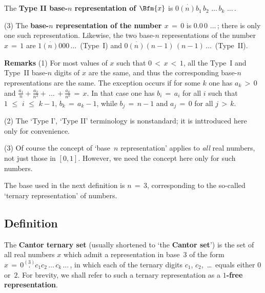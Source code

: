 {        The {\bf Type II base-$n$ representation of $\Bfm{x}$} is $0 \stackrel{.}{(n)}b_{1}\,b_{2}\,\,{\ldots}\,b_{k}\,\,{\ldots}\,$.

\VA

        (3) The {\bf base-$n$ representation of the number $x \,=\, 0$} is $0.0\,0\,\,{\ldots}\,$; there is only one such representation.
    Likewise, the two base-$n$ representations of the number $x \,=\, 1$ are $1\stackrel{.}{(n)}000\,{\ldots}\,$ (Type~I)
    and $0\stackrel{.}{(n)}(n-1)\,(n-1)\,{\ldots}\,$ (Type~II).

\VA



        {\bf Remarks} (1) For most values of $x$ such that $0\,<\,x\,<\,1$, all the Type~I and Type~II base-$n$ digits of $x$ are the same,
    and thus the corresponding base-$n$ representations are the same. The exception occurs if for some $k$ one has
    $a_{k}\,>\,0$ and ${\displaystyle \frac{a_{1}}{n} + \frac{a_{2}}{n^{2}} + \,{\ldots}\, + \frac{a_{k}}{n^{k}} \,=\, x}$.
    In that case one has $b_{i} \,=\, a_{i}$ for all $i$ such that $1\,\,{\leq}\,\,i\,\,{\leq}\,\,k-1$, $b_{k} \,=\, a_{k} - 1$,
    while $b_{j} \,=\, n-1$ and $a_{j} \,=\, 0$ for all $j\,>\,k$.

        (2) The `Type I', `Type II' terminology is nonstandard; it is inttroduced here only for convenience.

        (3) Of course the concept of `base~$n$ representation' applies to {\em all} real numbers, not just those in $[0,1]$.
    However, we need the concept here only for such numbers.

\VV

        The base used in the next definition is $n \,=\, 3$, corresponding to the so-called `ternary representation' of numbers.

\V

            \subsection{\small{\bf Definition}}
            \label{DefA20.100}

        The {\bf Cantor ternary set} (usually shortened to `the {\bf Cantor set}') is the set of all real numbers $x$
    which admit a representation in base~$3$ of the form $x \,=\, 0\stackrel{(3)}{.}c_{1}c_{2}\,{\ldots}\,c_{k}\,{\ldots}\,$,
    in which each of the ternary digits $c_{1}$, $c_{2}$, \,{\ldots}\, equals either $0$ or~$2$.
    For brevity, we shall refer to such a ternary representation as a {\bf $1$-free representation}.

}
